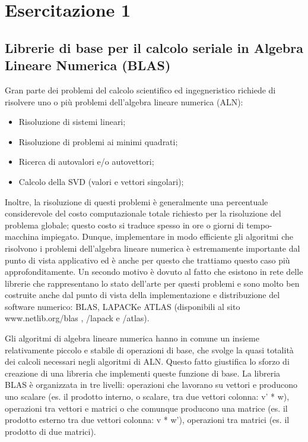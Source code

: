 \section{Esercitazione 1}

\subsection{Librerie di base per il calcolo seriale in Algebra Lineare Numerica (BLAS)}

Gran parte dei problemi del calcolo scientifico ed ingegneristico richiede di risolvere uno o più problemi dell'algebra lineare numerica (ALN):

\begin{itemize}

	\item Risoluzione di sistemi lineari;
	\item Risoluzione di problemi ai minimi quadrati;
	\item Ricerca di autovalori e/o autovettori;
	\item Calcolo della SVD (valori e vettori singolari);

\end{itemize}

Inoltre, la risoluzione di questi problemi è generalmente una percentuale considerevole del costo computazionale totale richiesto per la risoluzione del problema globale; questo costo si traduce spesso in ore o giorni di tempo-macchina impiegato. Dunque, implementare in modo efficiente gli algoritmi che risolvono i problemi dell'algebra lineare numerica è estremamente importante dal punto di vista applicativo ed è anche per questo che trattiamo questo caso più approfonditamente.
Un secondo motivo è dovuto al fatto che esistono in rete delle librerie che rappresentano lo stato dell'arte per questi problemi e sono molto ben costruite anche dal punto di vista della implementazione e distribuzione del software numerico: BLAS, LAPACKe ATLAS (disponibili al sito www.netlib.org/blas , /lapack e /atlas).

Gli algoritmi di algebra lineare numerica hanno in comune un insieme relativamente piccolo e stabile di operazioni di base, che svolge la quasi totalità dei calcoli necessari negli algoritmi di ALN. Questo fatto giustifica lo sforzo di creazione di una libreria che implementi queste funzione di base. La libreria BLAS è organizzata in tre livelli:
operazioni che lavorano su vettori e producono uno scalare  (es. il prodotto interno, o scalare, tra due vettori colonna: v' * w), operazioni tra vettori e matrici o che comunque producono una matrice (es. il prodotto esterno tra due vettori colonna: v * w'), operazioni tra matrici (es. il prodotto di due matrici).

